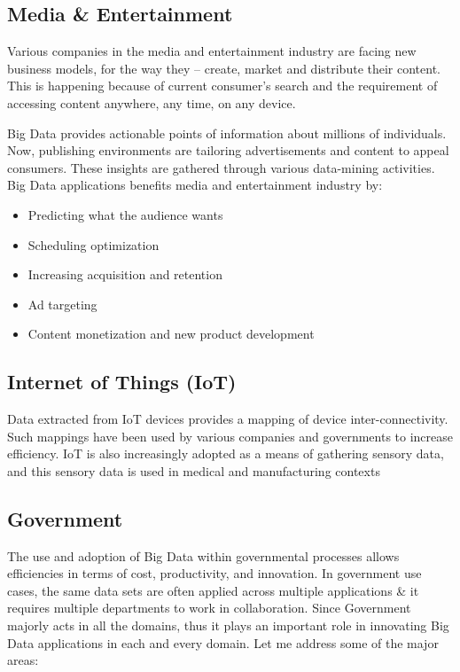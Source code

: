\subsection{Media \& Entertainment}
Various companies in the media and entertainment industry are facing new business models, for the way they –  create, market and distribute their content. This is happening because of current consumer’s search and the requirement of accessing content anywhere, any time, on any device.

Big Data provides actionable points of information about millions of individuals. Now, publishing environments are tailoring advertisements and content to appeal consumers. These insights are gathered through various data-mining activities. Big Data applications benefits media and entertainment industry by:
\begin{itemize}
    \item Predicting what the audience wants
    \item Scheduling optimization
    \item Increasing acquisition and retention
    \item Ad targeting
    \item Content monetization and new product development
\end{itemize}

\subsection{Internet of Things (IoT)}
Data extracted from IoT devices provides a mapping of device inter-connectivity. Such mappings have been used by various companies and governments to increase efficiency. IoT is also increasingly adopted as a means of gathering sensory data, and this sensory data is used in medical and manufacturing contexts

\subsection{Government}
The use and adoption of Big Data within governmental processes allows efficiencies in terms of cost, productivity, and innovation. In government use cases, the same data sets are often applied across multiple applications \& it requires multiple departments to work in collaboration.
Since Government majorly acts in all the domains, thus it plays an important role in innovating Big Data applications in each and every domain. Let me address some of the major areas:

